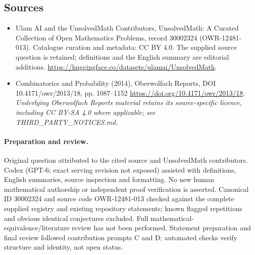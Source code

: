 \documentclass[11pt]{article}
\begin{document}
\subsection{Sources}
\begin{itemize}
\item[\hypertarget{source:30002324:1}{S1}] Ulam AI and the UnsolvedMath Contributors, UnsolvedMath: A Curated Collection of Open Mathematics Problems, record 30002324 (OWR-12481-013). Catalogue curation and metadata: CC BY 4.0. The supplied source question is retained; definitions and the English summary are editorial additions.
\url{https://huggingface.co/datasets/ulamai/UnsolvedMath}.
\item[\hypertarget{source:30002324:2}{S2}] Combinatorics and Probability (2014), Oberwolfach Reports, DOI 10.4171/owr/2013/18, pp. 1087--1152
\url{https://doi.org/10.4171/owr/2013/18}.
\textit{Underlying Oberwolfach Reports material retains its source-specific licence, including CC BY-SA 4.0 where applicable; see THIRD\_PARTY\_NOTICES.md.}
\end{itemize}
\paragraph{Preparation and review.}
Original question attributed to the cited source and UnsolvedMath contributors. Codex (GPT-6; exact serving revision not exposed) assisted with definitions, English summaries, source inspection and formatting. No new human mathematical authorship or independent proof verification is asserted. Canonical ID 30002324 and source code OWR-12481-013 checked against the complete supplied registry and existing repository statements; known flagged repetitions and obvious identical conjectures excluded. Full mathematical-equivalence/literature review has not been performed. Statement preparation and final review followed contribution prompts C and D; automated checks verify structure and identity, not open status.
\label{end:30002324}
\end{document}
